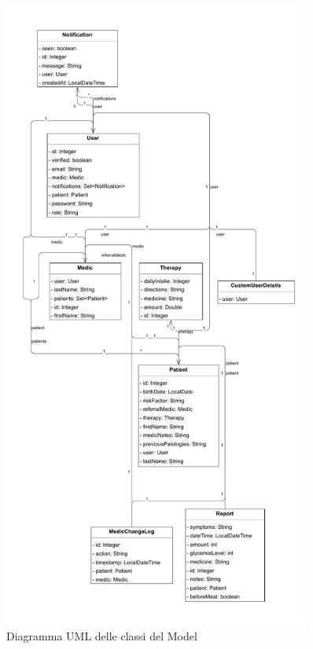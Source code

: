 \documentclass[a4paper]{article}
\begin{document}
\begin{figure}[H]
  \begin{center}
    \includegraphics[width=0.9\textwidth]{umlModel.pdf}
  \end{center}
  \caption{Diagramma UML delle classi del Model} 
\end{figure}
\noindent
\end{document}
